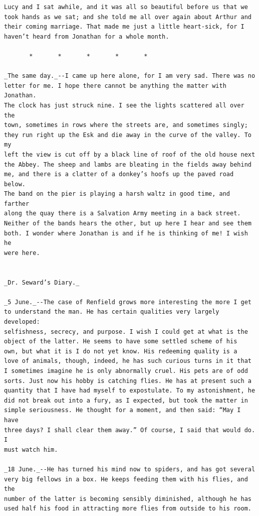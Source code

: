 \documentclass{article}
\begin{document}
\begin{verbatim}
Lucy and I sat awhile, and it was all so beautiful before us that we
took hands as we sat; and she told me all over again about Arthur and
their coming marriage. That made me just a little heart-sick, for I
haven’t heard from Jonathan for a whole month.

       *       *       *       *       *

_The same day._--I came up here alone, for I am very sad. There was no
letter for me. I hope there cannot be anything the matter with Jonathan.
The clock has just struck nine. I see the lights scattered all over the
town, sometimes in rows where the streets are, and sometimes singly;
they run right up the Esk and die away in the curve of the valley. To my
left the view is cut off by a black line of roof of the old house next
the Abbey. The sheep and lambs are bleating in the fields away behind
me, and there is a clatter of a donkey’s hoofs up the paved road below.
The band on the pier is playing a harsh waltz in good time, and farther
along the quay there is a Salvation Army meeting in a back street.
Neither of the bands hears the other, but up here I hear and see them
both. I wonder where Jonathan is and if he is thinking of me! I wish he
were here.


_Dr. Seward’s Diary._

_5 June._--The case of Renfield grows more interesting the more I get
to understand the man. He has certain qualities very largely developed:
selfishness, secrecy, and purpose. I wish I could get at what is the
object of the latter. He seems to have some settled scheme of his
own, but what it is I do not yet know. His redeeming quality is a
love of animals, though, indeed, he has such curious turns in it that
I sometimes imagine he is only abnormally cruel. His pets are of odd
sorts. Just now his hobby is catching flies. He has at present such a
quantity that I have had myself to expostulate. To my astonishment, he
did not break out into a fury, as I expected, but took the matter in
simple seriousness. He thought for a moment, and then said: “May I have
three days? I shall clear them away.” Of course, I said that would do. I
must watch him.

_18 June._--He has turned his mind now to spiders, and has got several
very big fellows in a box. He keeps feeding them with his flies, and the
number of the latter is becoming sensibly diminished, although he has
used half his food in attracting more flies from outside to his room.


\end{verbatim}
\end{document}
